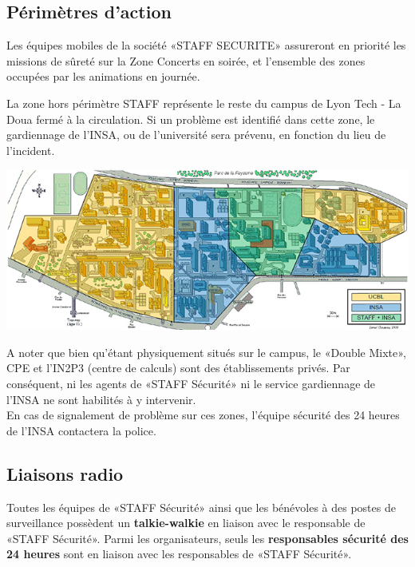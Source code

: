 \documentclass[hidelinks, paper=a4, fontsize=13pt]{report}
\begin{document}
\subsection{Périmètres d’action}

Les équipes mobiles de la société «STAFF SECURITE» assureront en priorité les missions de sûreté sur la Zone Concerts en soirée, et l’ensemble des zones occupées par les animations en journée. 

La zone hors périmètre STAFF représente le reste du campus de Lyon Tech - La Doua fermé à la circulation. Si un problème est identifié dans cette zone, le gardiennage de l’INSA, ou de l’université sera prévenu, en fonction du lieu de l’incident.

\begin{center}
	\includegraphics[scale=0.8]{Annexes/Plans/perimetreSecu}
\end{center}


A noter que bien qu’étant physiquement situés sur le campus, le «Double Mixte», CPE et l’IN2P3 (centre de calculs) sont des établissements privés. Par conséquent, ni les agents de «STAFF Sécurité» ni le service gardiennage de l’INSA ne sont habilités à y intervenir. \\

En cas de signalement de  problème sur ces zones, l’équipe sécurité des 24 heures de l'INSA contactera la police.

\subsection{Liaisons radio}

Toutes les équipes de «STAFF Sécurité» ainsi que les bénévoles à des postes de surveillance possèdent un \textbf{talkie-walkie} en liaison avec le responsable de «STAFF Sécurité». Parmi les organisateurs, seuls les \textbf{responsables sécurité des 24 heures} sont en liaison avec les responsables de «STAFF Sécurité».\\
\end{document}
